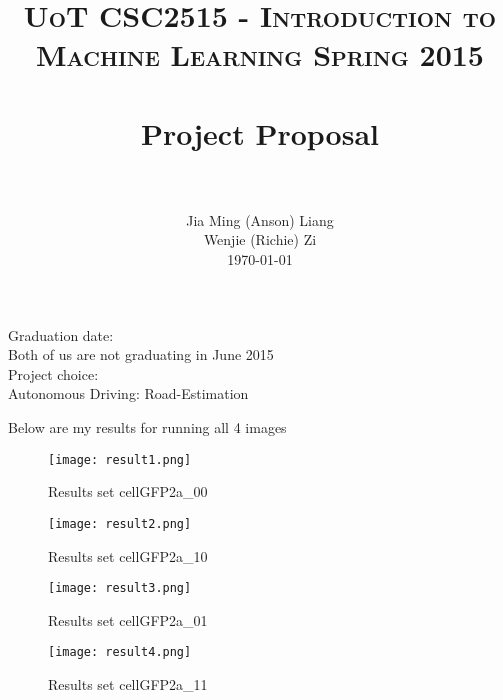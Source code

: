 \documentclass[paper=letter, fontsize=11pt]{scrartcl}
\title{
		\usefont{OT1}{bch}{b}{n}
		\normalfont \normalsize \textsc{UoT CSC2515 - Introduction to Machine Learning Spring 2015} \\ [25pt]
		\horrule{0.5pt} \\[0.4cm]
		\huge Project Proposal \\
		\horrule{2pt} \\[0.5cm]
}
\author{
		\normalfont 								\normalsize
        Jia Ming (Anson) Liang\\[-3pt]		\normalsize Wenjie (Richie) Zi\\[-3pt]		\normalsize
        \today
}
\date{}
\numberwithin{equation}{section}		%
\numberwithin{figure}{section}			%
\numberwithin{table}{section}				%
\begin{document}
\maketitle

Graduation date:\\
	Both of us are not graduating in June 2015\\

Project choice:\\
	Autonomous Driving: Road-Estimation\\















\if

Below are my results for running all 4 images
\begin{figure}[H]
\begin{center}
\texttt{[image: result1.png]}
\end{center}
\caption{Results set cellGFP2a\_00}
\label{fig:resultset1}
\end{figure}
\begin{figure}[H]
\begin{center}
\texttt{[image: result2.png]}
\end{center}
\caption{Results set cellGFP2a\_10}
\label{fig:resultset2}
\end{figure}
\begin{figure}[H]
\begin{center}
\texttt{[image: result3.png]}
\end{center}
\caption{Results set cellGFP2a\_01}
\label{fig:resultset3}
\end{figure}
\begin{figure}[H]
\begin{center}
\texttt{[image: result4.png]}
\end{center}
\caption{Results set cellGFP2a\_11}
\label{fig:resultset4}
\end{figure}

\fi
\end{document}
